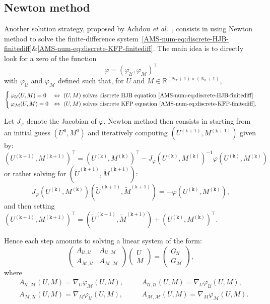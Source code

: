 \documentclass{amsproc}
\theoremstyle{definition}
\theoremstyle{remark}
\numberwithin{equation}{section}
\newcommand{\RR}{{\mathbb R}}
\newcommand{\cM}{{\mathcal M}}
\newcommand{\cU}{{\mathcal U}}
\begin{document}
\clearpage


\subsection{Newton method}
\label{sec:NewtonPDE}

Another solution strategy, proposed by Achdou \textit{et al.}~\cite{MR2888257}, consists in using Newton method to solve the finite-difference system~\eqref{AMS-num-eq:discrete-HJB-finitediff}\&\eqref{AMS-num-eq:discrete-KFP-finitediff}. The main idea is to directly look for a zero of the function 
$$
	\varphi = (\varphi_{\cU}, \varphi_{\cM})^\top
$$
 with $\varphi_{\cU}$ and $\varphi_{\cM}$ defined such that, for $U$ and $M \in \RR^{(N_T+1)\times(N_h+1)}$,
$$
\begin{cases}
	\varphi_{\cU}(U,M) = 0
	&\Leftrightarrow
	\hbox{ $(U,M)$ solves discrete HJB equation~\eqref{AMS-num-eq:discrete-HJB-finitediff}}
	\\
	\varphi_{\cM}(U,M) = 0
	&\Leftrightarrow
	\hbox{ $(U,M)$ solves discrete KFP equation~\eqref{AMS-num-eq:discrete-KFP-finitediff}.}
\end{cases}
$$


Let $J_\varphi$ denote the Jacobian of $\varphi$. Newton method then consists in starting from an initial guess $(U^0,M^0)$ and iteratively computing $(U^{(\mathtt{k}+1)}, M^{(\mathtt{k}+1)})$ given by:
$$
	(U^{(\mathtt{k}+1)}, M^{(\mathtt{k}+1)})^\top = (U^{(\mathtt{k})}, M^{(\mathtt{k})})^\top  - J_\varphi(U^{(\mathtt{k})}, M^{(\mathtt{k})})^{-1} \varphi(U^{(\mathtt{k})}, M^{(\mathtt{k})})
$$
or rather solving for $(\tilde U^{(\mathtt{k}+1)}, \tilde M^{(\mathtt{k}+1)})$:
$$
	J_\varphi(U^{(\mathtt{k})}, M^{(\mathtt{k})})  (\tilde U^{(\mathtt{k}+1)}, \tilde M^{(\mathtt{k}+1)}) = - \varphi(U^{(\mathtt{k})}, M^{(\mathtt{k})}),
$$
and then setting $(U^{(\mathtt{k}+1)}, M^{(\mathtt{k}+1)})^\top = (\tilde U^{(\mathtt{k}+1)}, \tilde M^{(\mathtt{k}+1)}) + (U^{(\mathtt{k})}, M^{(\mathtt{k})})^\top$.


Hence each step amounts to solving a linear system of the form:
\begin{equation}
\label{AMS-num-eq:Newton-system-sol}
	\begin{pmatrix}
		A_{\cU,\cU} & A_{\cU,\cM}
		\\
		A_{\cM,\cU} & A_{\cM,\cM}
	\end{pmatrix}
	\begin{pmatrix}
		U
		\\
		M
	\end{pmatrix}
	=
	\begin{pmatrix}
		G_{\cU}
		\\
		G_{\cM}
	\end{pmatrix},
\end{equation}
where
\begin{align*}
	&A_{\cU,\cM}(U,M) = \nabla_{U} \varphi_{\cM}(U,M), 
	\quad &&A_{\cU,\cU}(U,M) = \nabla_{U} \varphi_{\cU}(U,M), 
	\\ 
	&A_{\cM,\cU}(U,M) = \nabla_{M} \varphi_{\cU}(U,M), 
	\quad &&A_{\cM,\cM}(U,M) = \nabla_{M} \varphi_{\cM}(U,M). 
\end{align*}
\end{document}
